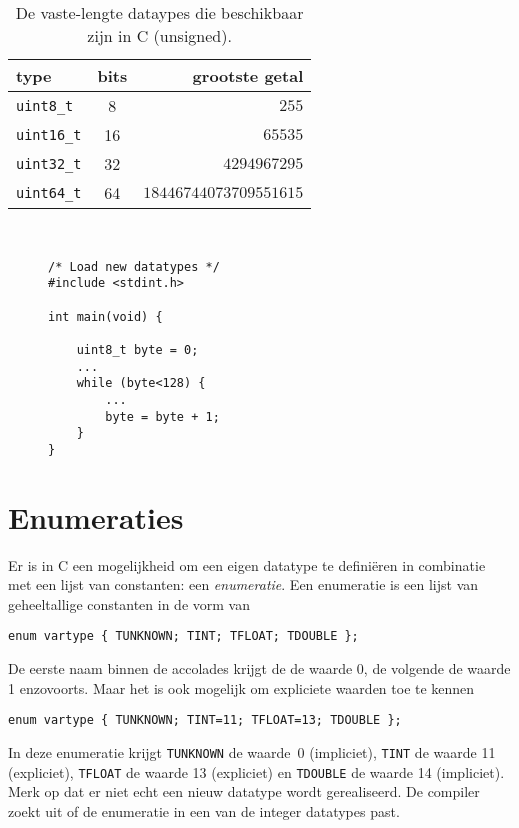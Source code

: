 \begin{table}[!ht]
\centering
\caption{De vaste-lengte dataypes die beschikbaar zijn in C (unsigned).}
\label{tab:varuinttdatatypes}
\begin{tabular}{@{}lcr@{}}
\toprule
\textbf{type}          & \textbf{bits} & \textbf{grootste getal} \\ \midrule
\texttt{uint8\_t}       & 8             & $255$                   \\
\texttt{uint16\_t}      & 16            & $65535$                 \\
\texttt{uint32\_t}      & 32            & $4294967295$            \\
\texttt{uint64\_t}      & 64            & $18446744073709551615$   \\
\bottomrule
\end{tabular}\\
\end{table}

\begin{figure}[!ht]
\begin{lstlisting}[caption=Voorbeeld van het gebruik van vaste-lengte datatypes.,label=cod:vastelengte]
/* Load new datatypes */
#include <stdint.h>

int main(void) {

    uint8_t byte = 0;
    ...
    while (byte<128) {
        ...
        byte = byte + 1;
    }
}
\end{lstlisting}
\end{figure}


\section{Enumeraties}
Er is in C een mogelijkheid om een eigen datatype te definiëren in combinatie met een lijst van constanten: een \textsl{enumeratie}. Een enumeratie is een lijst van geheeltallige constanten in de vorm van

\hspace*{1em}\texttt{enum vartype \{ TUNKNOWN; TINT; TFLOAT; TDOUBLE \};}

De eerste naam binnen de accolades krijgt de de waarde 0, de volgende de waarde 1 enzovoorts. Maar het is ook mogelijk om expliciete waarden toe te kennen

\hspace*{1em}\texttt{enum vartype \{ TUNKNOWN; TINT=11; TFLOAT=13; TDOUBLE \};}

In deze enumeratie krijgt \texttt{TUNKNOWN} de waarde~0 (impliciet), \texttt{TINT} de waarde 11 (expliciet), \texttt{TFLOAT} de waarde 13 (expliciet) en \texttt{TDOUBLE} de waarde 14 (impliciet). Merk op dat er niet echt een nieuw datatype wordt gerealiseerd. De compiler zoekt uit of de enumeratie in een van de integer datatypes past.



